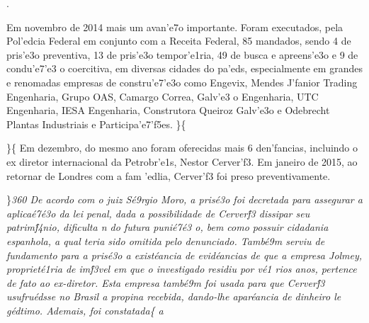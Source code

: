  . \par Em novembro de 2014 mais um
avan'e7o importante. Foram executados, pela Pol'edcia Federal em
conjunto com a Receita Federal, 85 mandados, sendo 4 de pris'e3o
preventiva, 13 de pris'e3o tempor'e1ria, 49 de busca e apreens'e3o e 9
de condu'e7'e3 o coercitiva, em diversas cidades do pa'eds,
especialmente em grandes e renomadas empresas de constru'e7'e3o como
Engevix, Mendes J'fanior Trading Engenharia, Grupo OAS, Camargo Correa,
Galv'e3 o Engenharia, UTC Engenharia, IESA Engenharia, Construtora
Queiroz Galv'e3o e Odebrecht Plantas Industriais e Participa'e7'f5es.
\}\{\rtlch{}  \ltrch{}  \par \}\{\rtlch{}
 \ltrch{}  Em dezembro, do mesmo
ano foram oferecidas mais 6 den'fancias, incluindo o ex diretor
internacional da Petrobr'e1s, Nestor Cerver'f3. Em janeiro de 2015, ao
retornar de Londres com a fam 'edlia, Cerver'f3 foi preso
preventivamente.
\par \}\pard \ltrpar\qj {}\sl360\widctlpar\wrapdefault\aspalpha\aspnum\faauto\adjustright{} {\rtlch{}  \ltrch{}  
De acordo com }{\rtlch{}  \ltrch{}  o juiz S\'e9rgio Moro, a pris\'e3o foi decretada para assegurar a aplica\'e7\'e3o da lei penal, dada a possibilidade de Cerver\'f3
 dissipar seu patrim\'f4nio, dificulta}{\rtlch{}  \ltrch{}  n}{\rtlch{}  \ltrch{}  do futura puni\'e7\'e3
o, bem como possuir cidadania espanhola, a qual }{\rtlch{}  \ltrch{}  teria sido}{\rtlch{}  \ltrch{}  
 omitida pelo denunciado. Tamb\'e9m serviu de fundamento para a pris\'e3o a exist\'eancia de evid\'eancias de que a empresa Jolmey, propriet\'e1ria de im\'f3vel em que o investigado residiu por v\'e1
rios anos, pertence de fato ao ex-diretor. Esta empresa tamb\'e9m foi usada para que Cerver\'f3 usufru\'edsse no Brasil a propina recebida, dando-lhe apar\'eancia de dinheiro le}{\rtlch{}  \ltrch{} 
 g\'edtimo. Ademais, foi constatada}\{\rtlch{}
 \ltrch{}
 a
